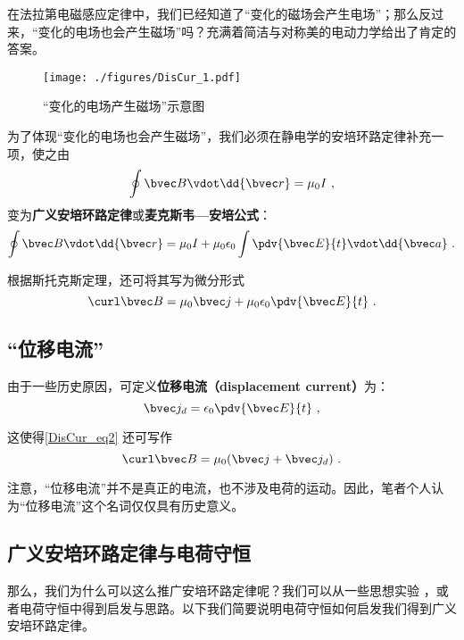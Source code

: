 
\begin{issues}
\issueDraft
\end{issues}


在法拉第电磁感应定律中，我们已经知道了“变化的磁场会产生电场”；那么反过来，“变化的电场也会产生磁场”吗？充满着简洁与对称美的电动力学给出了肯定的答案。

\begin{figure}[ht]
\centering
\texttt{[image: ./figures/DisCur\_1.pdf]}
\caption{“变化的电场产生磁场”示意图} \label{DisCur_fig1}
\end{figure}

为了体现“变化的电场也会产生磁场”，我们必须在静电学的安培环路定律补充一项，使之由
\begin{equation}
\oint \bvec B \vdot \dd{\bvec r} = \mu_0 I~,
\end{equation}
变为\textbf{广义安培环路定律}或\textbf{麦克斯韦—安培公式}：
\begin{equation}
\oint \bvec B \vdot \dd{\bvec r} = \mu_0 I + \mu_0 \epsilon_0 \int \pdv{\bvec E}{t} \vdot \dd{\bvec a}~.
\end{equation}

根据斯托克斯定理，还可将其写为微分形式
\begin{equation}\label{DisCur_eq2}
\curl \bvec B = \mu_0 \bvec j + \mu_0\epsilon_0 \pdv{\bvec E}{t}~.
\end{equation}

\subsection{“位移电流”}
由于一些历史原因，可定义\textbf{位移电流（displacement current）}为：
\begin{equation}
\bvec j_d = \epsilon_0 \pdv{\bvec E}{t}~,
\end{equation}

这使得\autoref{DisCur_eq2} 还可写作
\begin{equation}
\curl \bvec B = \mu_0 (\bvec j + \bvec j_d)~.
\end{equation}

注意，“位移电流”并不是真正的电流，也不涉及电荷的运动。因此，笔者个人认为“位移电流”这个名词仅仅具有历史意义。

\subsection{广义安培环路定律与电荷守恒}
那么，我们为什么可以这么推广安培环路定律呢？我们可以从一些思想实验
，或者电荷守恒中得到启发与思路。以下我们简要说明电荷守恒如何启发我们得到广义安培环路定律。

